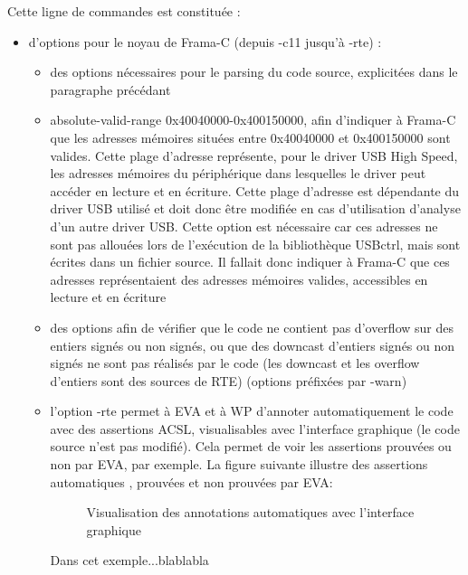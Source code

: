 Cette ligne de commandes est constituée :
\begin{itemize}
	\item d'options pour le noyau de Frama-C (depuis -c11 jusqu'à -rte) :
		\begin{itemize}
			\item des options nécessaires pour le parsing du code source, explicitées dans le paragraphe précédant
			\item absolute-valid-range 0x40040000-0x400150000, afin d'indiquer à Frama-C que les adresses mémoires situées entre 0x40040000 et 0x400150000 sont valides. Cette plage d'adresse représente, pour le driver USB High Speed, les adresses mémoires du périphérique dans lesquelles le driver peut accéder en lecture et en écriture. Cette plage d'adresse est dépendante du driver USB utilisé et doit donc être modifiée en cas d'utilisation d'analyse d'un autre driver USB. Cette option est nécessaire car ces adresses ne sont pas allouées lors de l'exécution de la bibliothèque USBctrl, mais sont écrites dans un fichier source. Il fallait donc indiquer à Frama-C que ces adresses représentaient des adresses mémoires valides, accessibles en lecture et en écriture
			\item des options afin de vérifier que le code ne contient pas d'overflow sur des entiers signés ou non signés, ou que des downcast d'entiers signés ou non signés ne sont pas réalisés par le code (les downcast et les overflow d'entiers sont des sources de RTE) (options préfixées par -warn)
			\item l'option -rte permet à EVA et à WP d'annoter automatiquement le code avec des assertions ACSL, visualisables avec l'interface graphique (le code source n'est pas modifié). Cela permet de voir les assertions prouvées ou non par EVA, par exemple. La figure suivante illustre des assertions automatiques , prouvées et non prouvées par EVA:

\begin{figure}[!h]
\centering
\caption{Visualisation des annotations automatiques avec l'interface graphique}
\label{Visualisation des annotations automatiques avec l'interface graphique}
\end{figure}

			Dans cet exemple...blablabla



\end{itemize}
\end{itemize}
